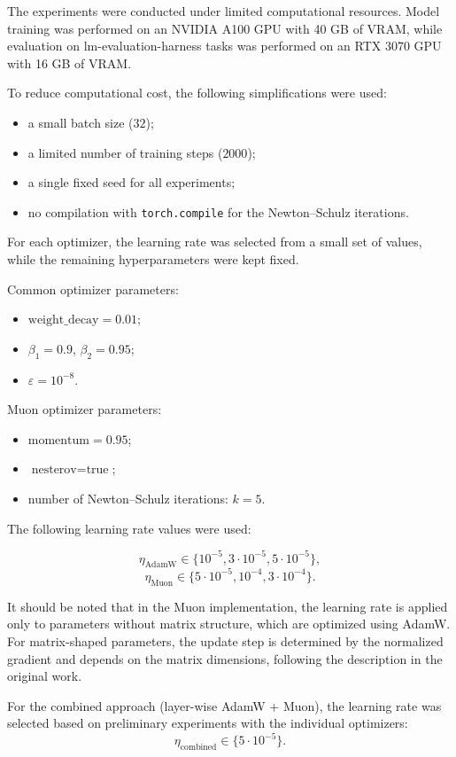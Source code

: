 \documentclass{article}
\begin{document}
The experiments were conducted under limited computational resources. Model training was performed on an NVIDIA A100 GPU with 40 GB of VRAM, while evaluation on lm-evaluation-harness tasks was performed on an RTX 3070 GPU with 16 GB of VRAM.

To reduce computational cost, the following simplifications were used:
\begin{itemize}
    \item a small batch size ($32$);
    \item a limited number of training steps ($2000$);
    \item a single fixed seed for all experiments;
    \item no compilation with \texttt{torch.compile} for the Newton--Schulz iterations.
\end{itemize}

For each optimizer, the learning rate was selected from a small set of values, while the remaining hyperparameters were kept fixed.

Common optimizer parameters:
\begin{itemize}
    \item $\text{weight\_decay} = 0.01$;
    \item $\beta_1 = 0.9$, $\beta_2 = 0.95$;
    \item $\varepsilon = 10^{-8}$.
\end{itemize}

Muon optimizer parameters:
\begin{itemize}
    \item $\text{momentum} = 0.95$;
    \item $\text{nesterov} = \text{true}$;
    \item number of Newton--Schulz iterations: $k = 5$.
\end{itemize}

The following learning rate values were used:

\[
\eta_{\text{AdamW}} \in \{10^{-5}, 3 \cdot 10^{-5}, 5 \cdot 10^{-5}\},
\]
\[
\eta_{\text{Muon}} \in \{5 \cdot 10^{-5}, 10^{-4}, 3 \cdot 10^{-4}\}.
\]

It should be noted that in the Muon implementation, the learning rate is applied only to parameters without matrix structure, which are optimized using AdamW. For matrix-shaped parameters, the update step is determined by the normalized gradient and depends on the matrix dimensions, following the description in the original work.

For the combined approach (layer-wise AdamW + Muon), the learning rate was selected based on preliminary experiments with the individual optimizers:
\[
\eta_{\text{combined}} \in \{5 \cdot 10^{-5}\}.
\]
\end{document}
